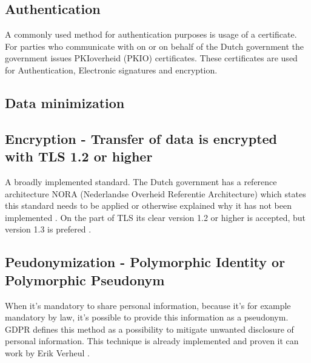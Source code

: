 \subsection{Authentication}
A commonly used method for authentication purposes is usage of a certificate. For parties who communicate with on or on behalf of the Dutch government the government issues PKIoverheid (PKIO) certificates. These certificates are used for Authentication, Electronic signatures and encryption. \cite{Logius_PKIO}

\subsection{Data minimization}
\lipsum[1-1]

\subsection{Encryption - Transfer of data is encrypted with TLS 1.2 or higher}
A broadly implemented standard. The Dutch government has a reference architecture NORA (Nederlandse Overheid Referentie Architecture) \cite{NORA} which states this standard needs to be applied or otherwise explained why it has not been implemented \cite{NORA_PasToeOfLegUit}. On the part of TLS its clear version 1.2 or higher is accepted, but version 1.3 is prefered \cite{NORA_TLS}. 

\subsection{Peudonymization - Polymorphic Identity or Polymorphic Pseudonym}
When it's mandatory to share personal information, because it's for example mandatory by law, it's possible to provide this information as a pseudonym. GDPR \cite{GDPR} defines this method as a possibility to mitigate unwanted disclosure of personal information. 
This technique is already implemented and proven it can work by Erik Verheul \cite{VerheuleID}.


